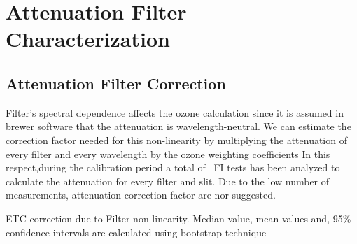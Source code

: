 
\section{Attenuation Filter Characterization} \label{sec:FI}

\subsection{Attenuation Filter Correction} \label{subsec:FIC}
Filter's spectral dependence affects the ozone calculation since it is assumed in brewer software that the attenuation is wavelength-neutral. We can estimate the correction factor needed for this non-linearity by multiplying the attenuation of every filter and every wavelength by the ozone weighting coefficients
In this respect,during the calibration period a total of \textbf{\NFI}\ FI tests has been analyzed to calculate the attenuation  for every filter and slit. Due to the low number of measurements, attenuation correction factor 
are nor suggested.



\begin{table}[b] \centering
	\caption{ETC correction due to Filter non-linearity. Median value, mean values and, 95\% confidence intervals are calculated using bootstrap technique}
	\label{tab:filter_correction}
	
\end{table}


